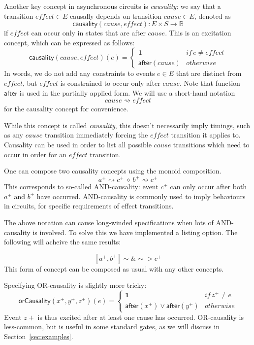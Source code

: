 \documentclass[british, journal]{IEEEtran}
\begin{document}
Another key concept in asynchronous circuits is \emph{causality}:
we say that a transition $\mathit{effect}\in E$ causally depends
on transition $\mathit{cause}\in E$, denoted as
\[
\mathsf{causality}(\mathit{cause},\mathit{effect}):E\times
S\rightarrow\mathbb{B}
\]
 if $\mathit{effect}$ can occur only in states that are after $\mathit{cause}$.
This is an excitation concept, which can be expressed as follows:
\[
\mathsf{causality}(\mathit{cause},\mathit{effect})(e)\!=\!\begin{cases}
\mathbf{1} & \mathit{if}\, e\neq\mathit{effect}\\
\mathsf{after}(cause) & \mathit{otherwise}
\end{cases}
\]
In words, we do not add any constraints to events $e\in E$ that are
distinct from $\mathit{effect}$, but $\mathit{effect}$ is constrained
to occur only after $\mathit{cause}$. Note that function $\mathsf{after}$
is used in the partially applied form. We will use a short-hand notation
\[
\mathit{cause}\rightsquigarrow\mathit{effect}
\]
for the causality concept for convenience.
 
While this concept is called \emph{causality}, this doesn't necessarily imply
timings, such as any $\mathit{cause}$ transition immediately forcing the
 $\mathit{effect}$ transition it applies to. Causality can be used in order to
list all possible $\mathit{cause}$ transitions which need to occur in order
 for an $\mathit{effect}$ transition.

One can compose two causality concepts using the monoid composition.
\[
a^{+}\rightsquigarrow c^{+}\ \diamond\ b^{+}\rightsquigarrow c^{+}
\]
This corresponds to so-called AND-causality: event $c^{+}$ can only occur
after both $a^{+}$ and $b^{+}$ have occurred. AND-causality is commonly used
to imply behaviours in circuits, for specific requirements of effect transitions.  

The above notation can cause long-winded specifications when lots of AND-causality is involved. 
To solve this we have implemented a listing option. The following will acheive the same results:

\[
[a^{+}, b^{+}]\sim\&\sim>c^{+}
\]
This form of concept can be composed as usual with any other concepts.

Specifying OR-causality is slightly more tricky:
\[
\mathsf{orCausality}(x^{+},y^{+},z^{+})(e)=\begin{cases}
\mathbf{1} & \mathit{if}\, z^{+}\neq\mathit{e}\\
\mathsf{after}(x^{+})\vee\mathsf{after}(y^{+}) & \mathit{otherwise}
\end{cases}
\]
Event $z+$ is thus excited after at least one cause has occurred. OR-causality is less-common,
but is useful in some standard gates, as we will discuss in Section~\ref{sec:examples}.
\end{document}
